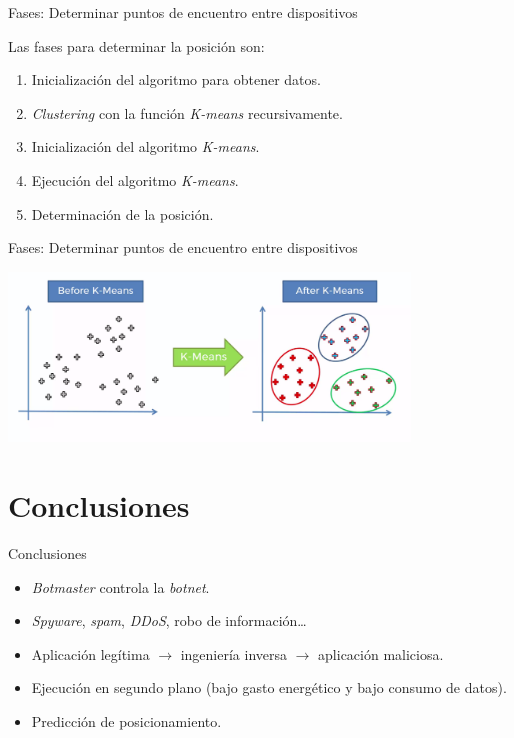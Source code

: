 \documentclass[aspectratio=43]{beamer}
\begin{document}
\begin{frame}{Fases: Determinar puntos de encuentro entre dispositivos}

Las fases para determinar la posición son:

\begin{enumerate}
\item Inicialización del algoritmo para obtener datos.
\item \emph{Clustering} con la función \emph{K-means} recursivamente.
\item Inicialización del algoritmo \emph{K-means}.
\item Ejecución del algoritmo \emph{K-means}.
\item Determinación de la posición.
\end{enumerate}

\end{frame}

\begin{frame}{Fases: Determinar puntos de encuentro entre dispositivos}

\centering
\includegraphics[width=0.8\textwidth]{figuras/kmeans}  

\end{frame}

\section{Conclusiones}

\begin{frame}{Conclusiones}

\begin{itemize}

\item \emph{Botmaster} controla la \emph{botnet}.
\item \emph{Spyware}, \emph{spam}, \emph{DDoS}, robo de información\ldots
\item Aplicación legítima $\rightarrow$ ingeniería inversa $\rightarrow$ aplicación maliciosa.
\item Ejecución en segundo plano (bajo gasto energético y bajo consumo de datos).
\item Predicción de posicionamiento.

\end{itemize}

\end{frame}



\maketitle
\end{document}
